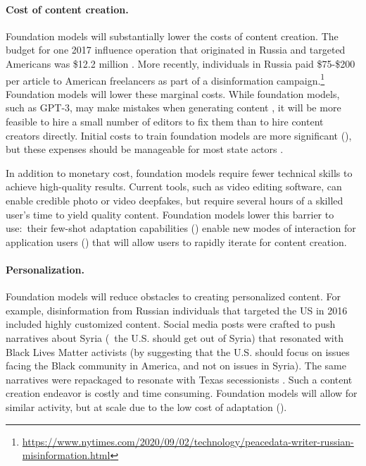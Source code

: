 \paragraph{Cost of content creation.}
Foundation models will substantially lower the costs of content creation. The budget for one 2017 influence operation that originated in Russia and targeted Americans was \$12.2 million \citep{DiResta2018TheT}.
More recently, individuals in Russia paid \$75-\$200 per article to American freelancers as part of a disinformation campaign.\footnote{\href{https://www.nytimes.com/2020/09/02/technology/peacedata-writer-russian-misinformation.html}{{ https://www.nytimes.com/2020/09/02/technology/peacedata-writer-russian-misinformation.html}}} 
Foundation models will lower these marginal costs. 
While foundation models, such as GPT-3, may make mistakes when generating content \citep{BuchananCSET2021}, it will be more feasible to hire a small number of editors to fix them than to hire content creators directly. 
Initial costs to train foundation models are more significant (), but these expenses should be manageable for most state actors \citep{BuchananCSET2021}.

In addition to monetary cost, foundation models require fewer technical skills to achieve high-quality results. 
Current tools, such as video editing software, can enable credible photo or video deepfakes, but require several hours of a skilled user’s time to yield quality content. 
Foundation models lower this barrier to use:~their few-shot adaptation capabilities () enable new modes of interaction for application users () that will allow users to rapidly iterate for content creation. 

\paragraph{Personalization.}
Foundation models will reduce obstacles to creating personalized  content. 
For example, disinformation from Russian individuals that targeted the US in 2016 included highly customized content. 
Social media posts were crafted to push narratives about Syria (\eg~the U.S. should get out of Syria) that resonated with Black Lives Matter activists \citep{DiResta2018TheT} (\eg by suggesting that the U.S. should focus on issues facing the Black community in America, and not on issues in Syria). 
The same narratives were repackaged to resonate with Texas secessionists \citep{diresta2021}. 
Such a content creation endeavor is costly and time consuming. 
Foundation models will allow for similar activity, but at scale due to the low cost of adaptation (). 


